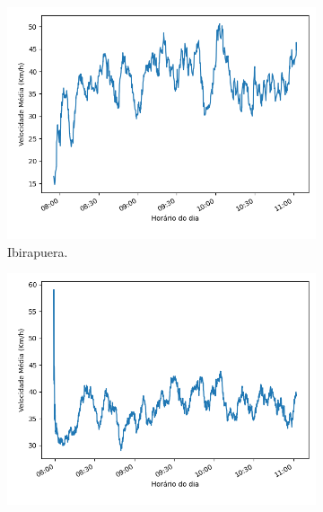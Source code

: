 \newpage


\begin{figure}[ht]
\centering
\begin{subfigure}{.45\textwidth}
  \centering
  \includegraphics[width=\textwidth]{figuras/detect_graphics/avg_speed_7-dez-su-corr_Ibirapuera.png}
  \caption{Ibirapuera.}
  \label{fig::avg_speed_Ibirapuera}
\end{subfigure}%
\begin{subfigure}{.45\textwidth}
  \centering
  \includegraphics[width=\textwidth]{figuras/detect_graphics/avg_speed_7-dez-su-corr_Inajar.png}

\end{subfigure}
\end{figure}
